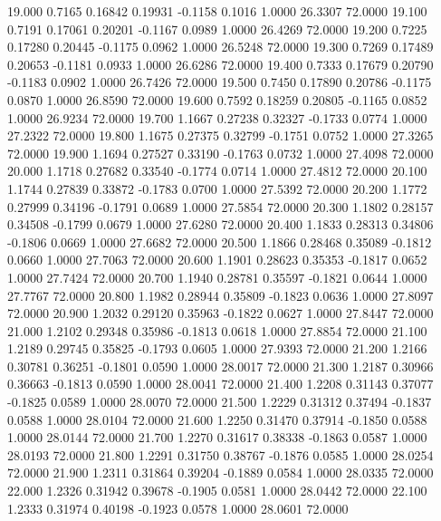   19.000   0.7165   0.16842   0.19931  -0.1158   0.1016   1.0000  26.3307  72.0000
  19.100   0.7191   0.17061   0.20201  -0.1167   0.0989   1.0000  26.4269  72.0000
  19.200   0.7225   0.17280   0.20445  -0.1175   0.0962   1.0000  26.5248  72.0000
  19.300   0.7269   0.17489   0.20653  -0.1181   0.0933   1.0000  26.6286  72.0000
  19.400   0.7333   0.17679   0.20790  -0.1183   0.0902   1.0000  26.7426  72.0000
  19.500   0.7450   0.17890   0.20786  -0.1175   0.0870   1.0000  26.8590  72.0000
  19.600   0.7592   0.18259   0.20805  -0.1165   0.0852   1.0000  26.9234  72.0000
  19.700   1.1667   0.27238   0.32327  -0.1733   0.0774   1.0000  27.2322  72.0000
  19.800   1.1675   0.27375   0.32799  -0.1751   0.0752   1.0000  27.3265  72.0000
  19.900   1.1694   0.27527   0.33190  -0.1763   0.0732   1.0000  27.4098  72.0000
  20.000   1.1718   0.27682   0.33540  -0.1774   0.0714   1.0000  27.4812  72.0000
  20.100   1.1744   0.27839   0.33872  -0.1783   0.0700   1.0000  27.5392  72.0000
  20.200   1.1772   0.27999   0.34196  -0.1791   0.0689   1.0000  27.5854  72.0000
  20.300   1.1802   0.28157   0.34508  -0.1799   0.0679   1.0000  27.6280  72.0000
  20.400   1.1833   0.28313   0.34806  -0.1806   0.0669   1.0000  27.6682  72.0000
  20.500   1.1866   0.28468   0.35089  -0.1812   0.0660   1.0000  27.7063  72.0000
  20.600   1.1901   0.28623   0.35353  -0.1817   0.0652   1.0000  27.7424  72.0000
  20.700   1.1940   0.28781   0.35597  -0.1821   0.0644   1.0000  27.7767  72.0000
  20.800   1.1982   0.28944   0.35809  -0.1823   0.0636   1.0000  27.8097  72.0000
  20.900   1.2032   0.29120   0.35963  -0.1822   0.0627   1.0000  27.8447  72.0000
  21.000   1.2102   0.29348   0.35986  -0.1813   0.0618   1.0000  27.8854  72.0000
  21.100   1.2189   0.29745   0.35825  -0.1793   0.0605   1.0000  27.9393  72.0000
  21.200   1.2166   0.30781   0.36251  -0.1801   0.0590   1.0000  28.0017  72.0000
  21.300   1.2187   0.30966   0.36663  -0.1813   0.0590   1.0000  28.0041  72.0000
  21.400   1.2208   0.31143   0.37077  -0.1825   0.0589   1.0000  28.0070  72.0000
  21.500   1.2229   0.31312   0.37494  -0.1837   0.0588   1.0000  28.0104  72.0000
  21.600   1.2250   0.31470   0.37914  -0.1850   0.0588   1.0000  28.0144  72.0000
  21.700   1.2270   0.31617   0.38338  -0.1863   0.0587   1.0000  28.0193  72.0000
  21.800   1.2291   0.31750   0.38767  -0.1876   0.0585   1.0000  28.0254  72.0000
  21.900   1.2311   0.31864   0.39204  -0.1889   0.0584   1.0000  28.0335  72.0000
  22.000   1.2326   0.31942   0.39678  -0.1905   0.0581   1.0000  28.0442  72.0000
  22.100   1.2333   0.31974   0.40198  -0.1923   0.0578   1.0000  28.0601  72.0000
